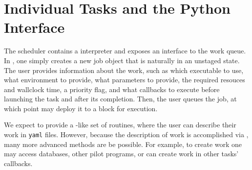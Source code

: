 \section{Individual Tasks and the Python Interface}
\label{sec:python}

The scheduler contains a \python interpreter and exposes an interface to the work queue.
In \python, one simply creates a new job object that is naturally in an unstaged state.
The user provides information about the work, such as which executable to use, what environment to provide, what parameters to provide, the required resouces and wallclock time, a priority flag, and what callbacks to execute before launching the task and after its completion.
Then, the user queues the job, at which point \jmscheduler may deploy it to a block for execution.

We expect to provide a \metaq-like set of routines, where the user can describe their work in \texttt{yaml}\cite{YAML} files.
However, because the description of work is accomplished via \python, many more advanced methods are be possible.
For example, to create work one may access databases, other pilot programs\cite{taxi1,taxi2}, or can create work in other tasks' callbacks.
